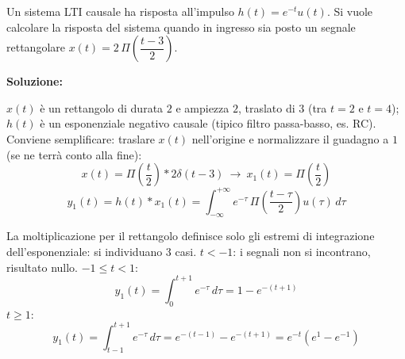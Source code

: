 \documentclass[12pt, a4paper]{article}
\begin{document}
\begin{center}
\end{center}

\bigskip

\begin{tcolorbox}[colback=lightergray!10, colframe=tocsec, title=\textbf{Esercizio 9}]
Un sistema LTI causale ha risposta all'impulso $h(t)=e^{-t}u(t)$. Si vuole calcolare la risposta del sistema quando in ingresso sia posto un segnale rettangolare $x(t)=2\,\Pi\!\left(\dfrac{t-3}{2}\right)$.
\end{tcolorbox}

\textbf{Soluzione:}

$x(t)$ è un rettangolo di durata $2$ e ampiezza $2$, traslato di $3$ (tra $t=2$ e $t=4$); $h(t)$ è un esponenziale negativo causale (tipico filtro passa-basso, es. RC). Conviene semplificare: traslare $x(t)$ nell'origine e normalizzare il guadagno a $1$ (se ne terrà conto alla fine):
$$x(t) = \Pi\!\left(\frac t2\right)*2\delta(t-3) \ \to\ x_1(t)=\Pi\!\left(\frac t2\right)$$
$$y_1(t) = h(t)*x_1(t) = \int_{-\infty}^{+\infty} e^{-\tau}\,\Pi\!\left(\frac{t-\tau}{2}\right)u(\tau)\,d\tau$$

\begin{center}
\end{center}

La moltiplicazione per il rettangolo definisce solo gli estremi di integrazione dell'esponenziale: si individuano 3 casi. $t<-1$: i segnali non si incontrano, risultato nullo. $-1\le t<1$:
$$y_1(t) = \int_0^{t+1}e^{-\tau}\,d\tau = 1-e^{-(t+1)}$$
$t\ge1$:
$$y_1(t) = \int_{t-1}^{t+1}e^{-\tau}\,d\tau = e^{-(t-1)}-e^{-(t+1)} = e^{-t}(e^1-e^{-1})$$
\end{document}
